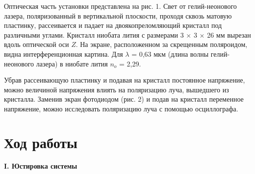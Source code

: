 \documentclass[a4paper,12pt]{article} %
\begin{document}
	Оптическая часть установки представлена на рис. 1. Свет от гелий-неонового лазера, поляризованный в вертикальной плоскости, проходя сквозь матовую пластинку, рассеивается и падает на двоякопреломляющий кристалл под различными углами. Кристалл ниобата лития с размерами 3 $\times$ 3 $\times$ 26 мм вырезан вдоль оптической оси $Z$. На экране, расположенном за скрещенным поляроидом, видна интерференционная картина. Для $\lambda$ = 0,63 мкм (длина волны гелий-неонового лазера) в ниобате лития $n_o$ = 2,29.
	
	Убрав рассеивающую пластинку и подавая на кристалл постоянное напряжение, можно величиной напряжения влиять на поляризацию луча, вышедшего из кристалла.
	Заменив экран фотодиодом (рис. 2) и подав на кристалл переменное напряжение, можно исследовать поляризацию луча с помощью осциллографа.
	
	\newpage
	
	\section*{Ход работы}
	
	\begin{center}
		\textbf{I. Юстировка системы}
	\end{center}
	
\end{document}
